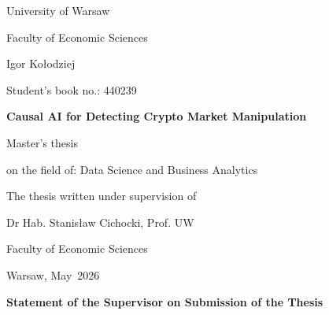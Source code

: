 \documentclass[12pt, a4paper]{report}
\newcommand{\thesisTitle}{Causal AI for Detecting Crypto Market Manipulation}
\newcommand{\thesisAuthor}{Igor Kołodziej}
\newcommand{\studentID}{440239}
\newcommand{\supervisor}{Dr Hab. Stanisław Cichocki, Prof. UW}
\newcommand{\fieldOfStudy}{Data Science and Business Analytics}
\newcommand{\submissionPlace}{Warsaw}
\newcommand{\submissionMonth}{May}
\newcommand{\submissionYear}{2026}
\begin{document}
\begin{titlepage}
  \thispagestyle{empty}
  \setcounter{page}{0}
  \centering
  {\fontsize{18pt}{21.6pt}\selectfont University of Warsaw \par}
  {\fontsize{18pt}{21.6pt}\selectfont Faculty of Economic Sciences \par}

  \vspace{2.5cm}

  {\fontsize{14pt}{16.8pt}\selectfont \thesisAuthor \par}
  {\fontsize{14pt}{16.8pt}\selectfont Student's book no.: \studentID \par}

  \vspace{1.8cm}

  {\bfseries\fontsize{20pt}{24pt}\selectfont \thesisTitle \par}

  \vspace{1.8cm}

  {\normalsize Master's thesis \par}
  {\normalsize on the field of: \fieldOfStudy \par}

  \vspace{1.8cm}

  \begin{flushright}
    The thesis written under supervision of\par
    \supervisor\par
    Faculty of Economic Sciences\par
  \end{flushright}

  \vfill

  {\normalsize \submissionPlace, \submissionMonth\ \submissionYear \par}
\end{titlepage}
\setcounter{page}{1}

\thispagestyle{plain}

\noindent \textbf{Statement of the Supervisor on Submission of the Thesis}

\vspace{0.45cm}
\end{document}
